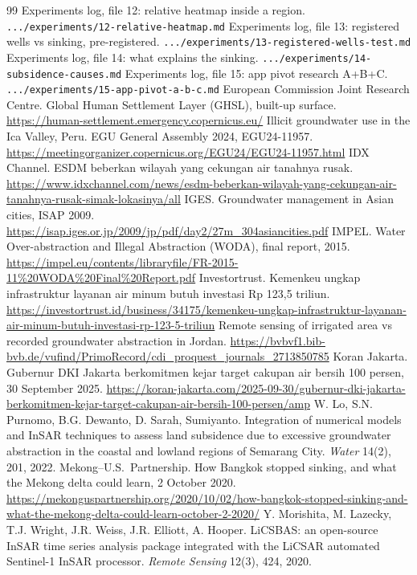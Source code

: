 \begin{thebibliography}{99}
 Experiments log, file 12: relative heatmap inside a region. \texttt{.../experiments/12-relative-heatmap.md}
 Experiments log, file 13: registered wells vs sinking, pre-registered. \texttt{.../experiments/13-registered-wells-test.md}
 Experiments log, file 14: what explains the sinking. \texttt{.../experiments/14-subsidence-causes.md}
 Experiments log, file 15: app pivot research A+B+C. \texttt{.../experiments/15-app-pivot-a-b-c.md}
 European Commission Joint Research Centre. Global Human Settlement Layer (GHSL), built-up surface. \url{https://human-settlement.emergency.copernicus.eu/}
 Illicit groundwater use in the Ica Valley, Peru. EGU General Assembly 2024, EGU24-11957. \url{https://meetingorganizer.copernicus.org/EGU24/EGU24-11957.html}
 IDX Channel. ESDM beberkan wilayah yang cekungan air tanahnya rusak. \url{https://www.idxchannel.com/news/esdm-beberkan-wilayah-yang-cekungan-air-tanahnya-rusak-simak-lokasinya/all}
 IGES. Groundwater management in Asian cities, ISAP 2009. \url{https://isap.iges.or.jp/2009/jp/pdf/day2/27m_304asiancities.pdf}
 IMPEL. Water Over-abstraction and Illegal Abstraction (WODA), final report, 2015. \url{https://impel.eu/contents/libraryfile/FR-2015-11%20WODA%20Final%20Report.pdf}
 Investortrust. Kemenkeu ungkap infrastruktur layanan air minum butuh investasi Rp 123,5 triliun. \url{https://investortrust.id/business/34175/kemenkeu-ungkap-infrastruktur-layanan-air-minum-butuh-investasi-rp-123-5-triliun}
 Remote sensing of irrigated area vs recorded groundwater abstraction in Jordan. \url{https://bvbvf1.bib-bvb.de/vufind/PrimoRecord/cdi_proquest_journals_2713850785}
 Koran Jakarta. Gubernur DKI Jakarta berkomitmen kejar target cakupan air bersih 100 persen, 30 September 2025. \url{https://koran-jakarta.com/2025-09-30/gubernur-dki-jakarta-berkomitmen-kejar-target-cakupan-air-bersih-100-persen/amp}
 W. Lo, S.N. Purnomo, B.G. Dewanto, D. Sarah, Sumiyanto. Integration of numerical models and InSAR techniques to assess land subsidence due to excessive groundwater abstraction in the coastal and lowland regions of Semarang City. \emph{Water} 14(2), 201, 2022.
 Mekong--U.S.\ Partnership. How Bangkok stopped sinking, and what the Mekong delta could learn, 2 October 2020. \url{https://mekonguspartnership.org/2020/10/02/how-bangkok-stopped-sinking-and-what-the-mekong-delta-could-learn-october-2-2020/}
 Y. Morishita, M. Lazecky, T.J. Wright, J.R. Weiss, J.R. Elliott, A. Hooper. LiCSBAS: an open-source InSAR time series analysis package integrated with the LiCSAR automated Sentinel-1 InSAR processor. \emph{Remote Sensing} 12(3), 424, 2020.

\end{thebibliography}
